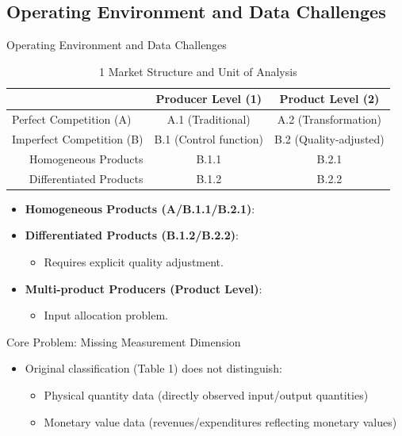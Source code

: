 \documentclass[aspectratio=169]{beamer}  %
\begin{document}
\subsection{Operating Environment and Data Challenges}
\begin{frame}{Operating Environment and Data Challenges}
    \begin{table}[h]
    \centering
    \caption{1 Market Structure and Unit of Analysis}
    \begin{tabular}{lcc}
    \hline
    & Producer Level (1) & Product Level (2) \\
    \hline
    Perfect Competition (A) & A.1 (Traditional) & A.2 (Transformation) \\
    Imperfect Competition (B) & B.1 (Control function) & B.2 (Quality-adjusted) \\
    \multicolumn{1}{r}{Homogeneous Products} & B.1.1 & B.2.1 \\
    \multicolumn{1}{r}{Differentiated Products} & B.1.2 & B.2.2 \\
    \hline
    \end{tabular}
    \end{table}

    \begin{itemize}
        \item \textbf{Homogeneous Products (A/B.1.1/B.2.1)}:
        \item \textbf{Differentiated Products (B.1.2/B.2.2)}:
        \begin{itemize}
            \item Requires explicit quality adjustment.
        \end{itemize}
        \item \textbf{Multi-product Producers (Product Level)}:
        \begin{itemize}
            \item Input allocation problem.
        \end{itemize}
    \end{itemize}
\end{frame}


\begin{frame}{Core Problem: Missing Measurement Dimension}
\begin{itemize}
    \item Original classification (Table 1) does not distinguish:
    \begin{itemize}
        \item Physical quantity data (directly observed input/output quantities)
        \item Monetary value data (revenues/expenditures reflecting monetary values)
    \end{itemize}
\end{itemize}
\end{frame}
\end{document}
